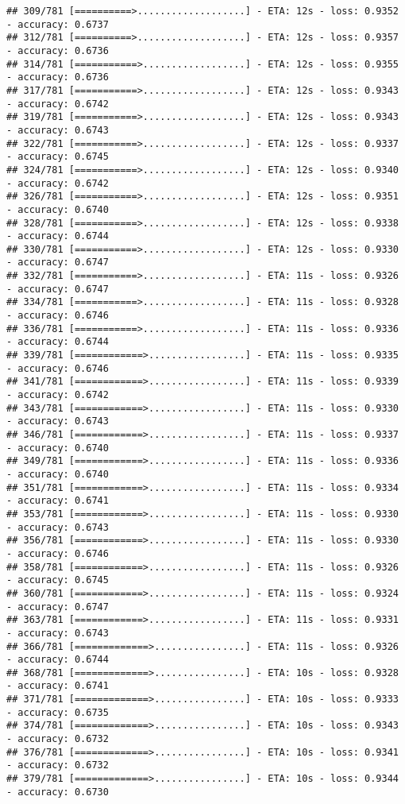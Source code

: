 \documentclass[
]{article}
\begin{document}
\begin{verbatim}
## 309/781 [==========>...................] - ETA: 12s - loss: 0.9352 - accuracy: 0.6737
## 312/781 [==========>...................] - ETA: 12s - loss: 0.9357 - accuracy: 0.6736
## 314/781 [===========>..................] - ETA: 12s - loss: 0.9355 - accuracy: 0.6736
## 317/781 [===========>..................] - ETA: 12s - loss: 0.9343 - accuracy: 0.6742
## 319/781 [===========>..................] - ETA: 12s - loss: 0.9343 - accuracy: 0.6743
## 322/781 [===========>..................] - ETA: 12s - loss: 0.9337 - accuracy: 0.6745
## 324/781 [===========>..................] - ETA: 12s - loss: 0.9340 - accuracy: 0.6742
## 326/781 [===========>..................] - ETA: 12s - loss: 0.9351 - accuracy: 0.6740
## 328/781 [===========>..................] - ETA: 12s - loss: 0.9338 - accuracy: 0.6744
## 330/781 [===========>..................] - ETA: 12s - loss: 0.9330 - accuracy: 0.6747
## 332/781 [===========>..................] - ETA: 11s - loss: 0.9326 - accuracy: 0.6747
## 334/781 [===========>..................] - ETA: 11s - loss: 0.9328 - accuracy: 0.6746
## 336/781 [===========>..................] - ETA: 11s - loss: 0.9336 - accuracy: 0.6744
## 339/781 [============>.................] - ETA: 11s - loss: 0.9335 - accuracy: 0.6746
## 341/781 [============>.................] - ETA: 11s - loss: 0.9339 - accuracy: 0.6742
## 343/781 [============>.................] - ETA: 11s - loss: 0.9330 - accuracy: 0.6743
## 346/781 [============>.................] - ETA: 11s - loss: 0.9337 - accuracy: 0.6740
## 349/781 [============>.................] - ETA: 11s - loss: 0.9336 - accuracy: 0.6740
## 351/781 [============>.................] - ETA: 11s - loss: 0.9334 - accuracy: 0.6741
## 353/781 [============>.................] - ETA: 11s - loss: 0.9330 - accuracy: 0.6743
## 356/781 [============>.................] - ETA: 11s - loss: 0.9330 - accuracy: 0.6746
## 358/781 [============>.................] - ETA: 11s - loss: 0.9326 - accuracy: 0.6745
## 360/781 [============>.................] - ETA: 11s - loss: 0.9324 - accuracy: 0.6747
## 363/781 [============>.................] - ETA: 11s - loss: 0.9331 - accuracy: 0.6743
## 366/781 [=============>................] - ETA: 11s - loss: 0.9326 - accuracy: 0.6744
## 368/781 [=============>................] - ETA: 10s - loss: 0.9328 - accuracy: 0.6741
## 371/781 [=============>................] - ETA: 10s - loss: 0.9333 - accuracy: 0.6735
## 374/781 [=============>................] - ETA: 10s - loss: 0.9343 - accuracy: 0.6732
## 376/781 [=============>................] - ETA: 10s - loss: 0.9341 - accuracy: 0.6732
## 379/781 [=============>................] - ETA: 10s - loss: 0.9344 - accuracy: 0.6730

\end{verbatim}
\end{document}
